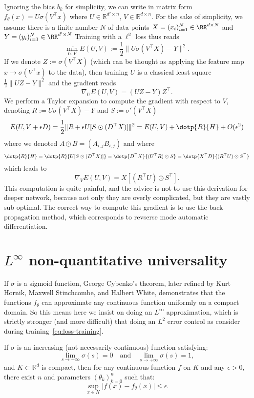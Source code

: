 Ignoring the bias $b_k$ for simplicity, we can write in matrix form $f_\theta(x) = U \sigma(V^\top x)$ where $U \in \mathbb{R}^{d' \times n}$, $V \in \mathbb{R}^{d \times n}$. 
For the sake of simplicity, we assume there is a finite number $N$ of data points $X = (x_i)_{i=1}^N \in \RR^{d \times N}$
and $Y = (y_i)_{i=1}^N \in \RR^{d' \times N}$
Training with a $\ell^2$ loss thus reads
$$
	\min_{U,V} E(U,V) := \frac{1}{2}\| U \sigma(V^\top X) - Y \|^2.
$$
If we denote $Z := \sigma(V^\top X)$ (which can be thought as applying the feature map $x \to \sigma(V^\top x)$ to the data), then training $U$ is a classical least square $\frac{1}{2}\|U Z - Y\|^2$ and the gradient reads
$$
	\nabla_U E(U,V) = (UZ-Y)Z^\top.
$$
We perform a Taylor expansion to compute the gradient with respect to $V$, denoting $R := U \sigma(V^\top X) - Y$ and $S := \sigma'(V^\top X) $
$$
	E(U,V + \epsilon D) = \frac{1}{2} \|R + \epsilon U [ S \odot (D^\top X) ] \|^2 = E(U,V) + \dotp{R}{H} + O(\epsilon^2)
$$
where we denoted $A \odot B = (A_{i,j} B_{i,j})$ and where
$$
	\dotp{R}{H} = \dotp{R}{ U [S \odot (D^\top X)] }	
	= \dotp{D^\top X}{ (U^\top R) \odot S}
	= \dotp{X^\top D}{ (R^\top U) \odot S^\top}
$$
which leads to
$$
	\nabla_V E(U,V) = X [ (R^\top U) \odot S^\top ].
$$
This computation is quite painful, and the advice is not to use this derivation for deeper network, because not only they are overly complicated, but they are vastly sub-optimal. The correct way to compute this gradient is to use the back-propagation method, which corresponds to revserse mode automatic differentiation. 



\section{$L^\infty$ non-quantitative universality}

If $\sigma$ is a sigmoid function, George Cybenko's theorem, later refined by Kurt Hornik, Maxwell Stinchcombe, and Halbert White, demonstrates that the functions $f_\theta$ can approximate any continuous function uniformly on a compact domain. So this means here we insist on doing an $L^\infty$ approximation, which is strictly stronger (and more difficult) that doing an $L^2$ error control as consider during training~\eqref{eq:loss-training}.

\begin{prop}
If $\sigma$ is an increasing (not necessarily continuous) function satisfying:
\[
	\lim_{s \to -\infty} \sigma(s) = 0 \quad \text{and} \quad \lim_{s \to +\infty} \sigma(s) = 1,
\]
and $K \subset \mathbb{R}^d$ is compact, then for any continuous function $f$ on $K$ and any $\epsilon > 0$, there exist $n$ and parameters $(\theta_k)_{k=0}^n$ such that:
\[
	\sup_{x \in K} |f(x) - f_\theta(x)| \leq \epsilon.
\]
\end{prop}

